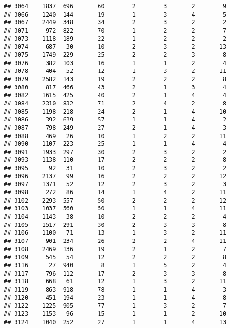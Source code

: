 \documentclass[]{article}
\begin{document}
\begin{verbatim}
## 3064    1837  696       60        2        3       2        9
## 3066    1240  144       19        1        3       4        5
## 3067    2449  348       34        2        3       2        2
## 3071     972  822       70        1        2       2        7
## 3073    1118  189       22        1        2       2        2
## 3074     687   30       10        2        3       2       13
## 3075    1749  229       25        2        2       3        8
## 3076     382  103       16        1        1       2        4
## 3078     404   52       12        1        3       2       11
## 3079    2582  143       19        2        2       2        8
## 3080     817  466       43        2        1       3        4
## 3082    1615  425       40        2        1       4        4
## 3084    2310  832       71        2        4       2        8
## 3085    1198  218       24        2        1       4       10
## 3086     392  639       57        1        1       4        2
## 3087     798  249       27        2        1       4        3
## 3088     469   26       10        1        2       2       11
## 3090    1107  223       25        1        1       4        4
## 3091    1933  297       30        2        3       2        2
## 3093    1138  110       17        2        2       2        8
## 3095      92   31       10        2        3       2        2
## 3096    2137   99       16        2        2       2       12
## 3097    1371   52       12        2        3       2        3
## 3098     272   86       14        1        4       2       11
## 3102    2293  557       50        2        2       2       12
## 3103    1037  560       50        1        1       4       11
## 3104    1143   38       10        2        2       2        4
## 3105    1517  291       30        2        3       3        8
## 3106    1100   71       13        1        3       2       11
## 3107     901  234       26        2        2       4       11
## 3108    2469  136       19        2        1       2        7
## 3109     545   54       12        2        2       2        8
## 3116      27  940        8        1        5       2        4
## 3117     796  112       17        2        3       3        8
## 3118     668   61       12        1        3       2       11
## 3119     863  918       78        1        1       4        3
## 3120     451  194       23        1        1       4        8
## 3122    1225  905       77        1        3       2        7
## 3123    1153   96       15        1        1       2       10
## 3124    1040  252       27        1        1       4       13

\end{verbatim}
\end{document}
